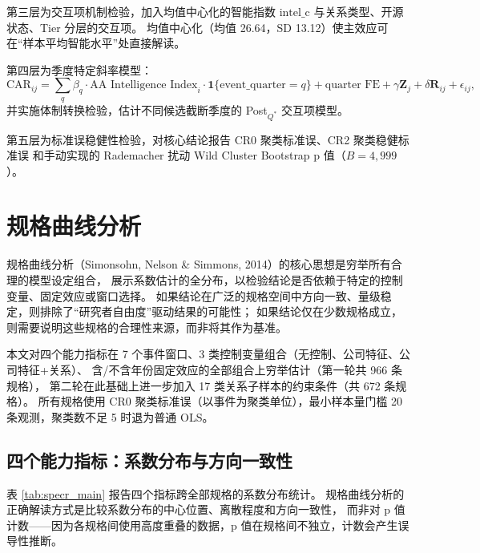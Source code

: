 \documentclass[11pt,fontset=fandol,a4paper]{ctexart}
\begin{document}
第三层为交互项机制检验，加入均值中心化的智能指数 $\text{intel\_c}$ 与关系类型、开源状态、Tier 分层的交互项。
均值中心化（均值 26.64，SD 13.12）使主效应可在``样本平均智能水平''处直接解读。

第四层为季度特定斜率模型：
\begin{equation}
\text{CAR}_{ij} = \sum_q \beta_q \cdot \text{AA Intelligence Index}_i \cdot \mathbf{1}\{\text{event\_quarter}=q\}
+ \text{quarter FE} + \gamma \mathbf{Z}_j + \delta \mathbf{R}_{ij} + \epsilon_{ij},
\label{eq:quarter}
\end{equation}
并实施体制转换检验，估计不同候选截断季度的 Post$_{Q^*}$ 交互项模型。

第五层为标准误稳健性检验，对核心结论报告 CR0 聚类标准误、CR2 聚类稳健标准误 \citep{BellMcCaffrey2002}
和手动实现的 Rademacher 扰动 Wild Cluster Bootstrap p 值（$B=4{,}999$）。

\section{规格曲线分析}

规格曲线分析（Simonsohn, Nelson \& Simmons, 2014）的核心思想是穷举所有合理的模型设定组合，
展示系数估计的全分布，以检验结论是否依赖于特定的控制变量、固定效应或窗口选择。
如果结论在广泛的规格空间中方向一致、量级稳定，则排除了``研究者自由度''驱动结果的可能性；
如果结论仅在少数规格成立，则需要说明这些规格的合理性来源，而非将其作为基准。

本文对四个能力指标在 7 个事件窗口、3 类控制变量组合（无控制、公司特征、公司特征+关系）、
含/不含年份固定效应的全部组合上穷举估计（第一轮共 966 条规格），
第二轮在此基础上进一步加入 17 类关系子样本的约束条件（共 672 条规格）。
所有规格使用 CR0 聚类标准误（以事件为聚类单位），最小样本量门槛 20 条观测，聚类数不足 5 时退为普通 OLS。

\subsection{四个能力指标：系数分布与方向一致性}

表 \ref{tab:specr_main} 报告四个指标跨全部规格的系数分布统计。
规格曲线分析的正确解读方式是比较系数分布的中心位置、离散程度和方向一致性，
而非对 p 值计数——因为各规格间使用高度重叠的数据，p 值在规格间不独立，计数会产生误导性推断。
\end{document}
